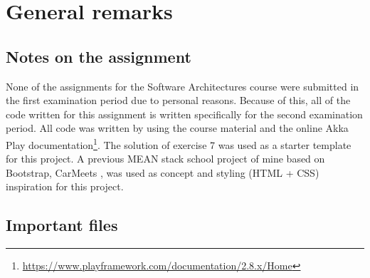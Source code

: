 \chapter{General remarks}
\label{ch:general_remarks}


\section{Notes on the assignment}
\label{sec:notes_on_ass}

None of the assignments for the Software Architectures course were submitted in the first examination period due to personal reasons.
Because of this, all of the code written for this assignment is written specifically for the second examination period.
All code was written by using the course material and the online Akka Play documentation\footnote{\url{https://www.playframework.com/documentation/2.8.x/Home}}.
The solution of exercise 7 was used as a starter template for this project.
A previous MEAN stack school project of mine based on Bootstrap, CarMeets \citep{github_carmeets}, was used as concept and styling (HTML + CSS) inspiration for this project.


\section{Important files}
\label{sec:important_files}

